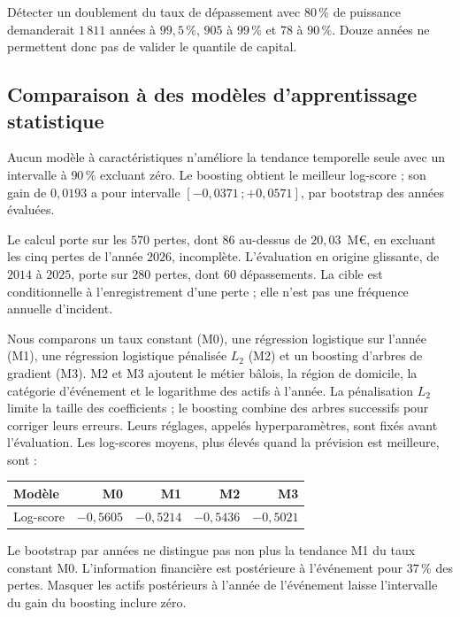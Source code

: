 Détecter un doublement du taux de dépassement avec $80\,\%$ de puissance demanderait $1\,811$
années à $99{,}5\,\%$, $905$ à $99\,\%$ et $78$ à $90\,\%$. Douze années ne permettent donc
pas de valider le quantile de capital.

\subsection{Comparaison à des modèles d'apprentissage statistique}
\label{soc:sec:benchmark-apprentissage}

Aucun modèle à caractéristiques n'améliore la tendance temporelle seule avec un intervalle
à $90\,\%$ excluant zéro. Le boosting obtient le meilleur log-score ; son gain de $0{,}0193$
a pour intervalle $[-0{,}0371\,;+0{,}0571]$, par bootstrap des années évaluées.

Le calcul porte sur les $570$ pertes, dont $86$ au-dessus de $20{,}03$~M\euro,
en excluant les cinq pertes de l'année $2026$, incomplète. L'évaluation en origine glissante,
de $2014$ à $2025$, porte sur $280$ pertes, dont $60$ dépassements. La cible est conditionnelle à l'enregistrement d'une perte ;
elle n'est pas une fréquence annuelle d'incident.

Nous comparons un taux constant (M0), une régression logistique sur l'année (M1), une régression
logistique pénalisée $L_2$ (M2) et un boosting d'arbres de gradient (M3). M2 et M3 ajoutent le métier
bâlois, la région de domicile, la catégorie d'événement et le logarithme des actifs à l'année.
La pénalisation $L_2$ limite la taille des coefficients ; le boosting combine des arbres successifs
pour corriger leurs erreurs. Leurs réglages, appelés hyperparamètres, sont fixés avant l'évaluation.
Les log-scores moyens, plus élevés quand
la prévision est meilleure, sont :
\begin{center}\small
\begin{tabular}{@{}lrrrr@{}}
\toprule
Modèle & M0 & M1 & M2 & M3 \\
\midrule
Log-score & $-0{,}5605$ & $-0{,}5214$ & $-0{,}5436$ & $-0{,}5021$ \\
\bottomrule
\end{tabular}
\end{center}
Le bootstrap par années ne distingue pas non plus la tendance M1 du taux constant M0.
L'information financière est postérieure à l'événement pour $37\,\%$ des pertes. Masquer les actifs
postérieurs à l'année de l'événement laisse l'intervalle du gain du boosting inclure zéro.

